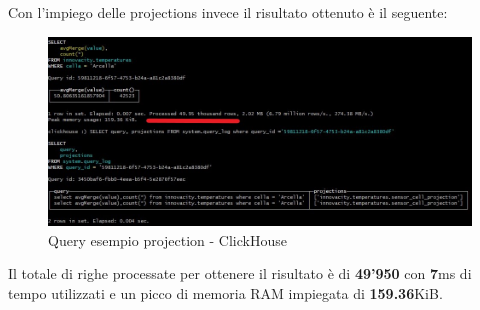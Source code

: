 Con l'impiego delle projections invece il risultato ottenuto è il seguente:

\begin{figure}[H]
    \centering
    \includegraphics[width=1\textwidth]{../Images/SpecificaTecnica/query2ProjectionsWith.jpg}
    \caption{Query esempio projection - ClickHouse}
    \label{fig:with2proj}
\end{figure}

Il totale di righe processate per ottenere il risultato è di \textbf{49'950} con \textbf{7}ms di tempo utilizzati e un picco di memoria RAM impiegata di \textbf{159.36}KiB.


